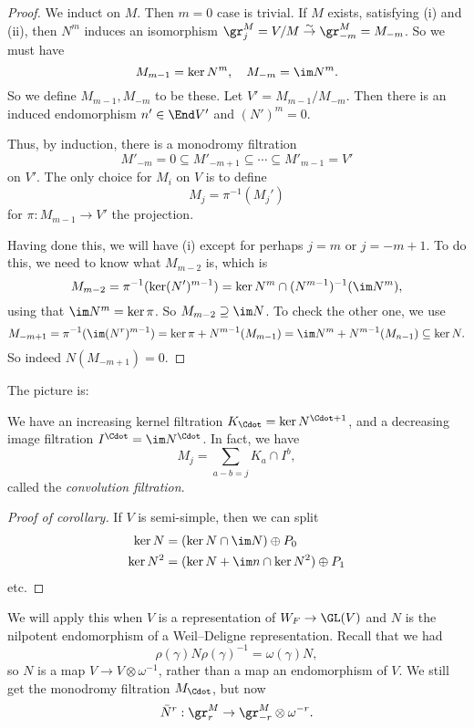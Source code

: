 \documentclass[a4paper]{article}
\begin{document}
\begin{proof}
  We induct on $M$. Then $m = 0$ case is trivial. If $M$ exists, satisfying (i) and (ii), then $N^m$ induces an isomorphism $\gr_j^M = V/M \overset{\sim}{\to} \gr_{-m}^M = M_{-m}$. So we must have
  \[
    M_{m - 1}  = \ker N^m,\quad M_{-m} = \im N^m.
  \]
  So we define $M_{m - 1}, M_{-m}$ to be these. Let $V' = M_{m - 1}/M_{-m}$. Then there is an induced endomorphism $n' \in \End V'$ and $(N')^m = 0$.

  Thus, by induction, there is a monodromy filtration
  \[
    M'_{-m} = 0 \subseteq M'_{-m + 1} \subseteq \cdots \subseteq M'_{m - 1} = V'
  \]
  on $V'$. The only choice for $M_i$ on $V$ is to define
  \[
    M_j = \pi^{-1}(M_j')
  \]
  for $\pi: M_{m - 1} \to V'$ the projection.

  Having done this, we will have (i) except for perhaps $j = m$ or $j = -m + 1$. To do this, we need to know what $M_{m - 2}$ is, which is
  \[
    M_{m - 2} = \pi^{-1}(\ker (N')^{m - 1}) = \ker N^m \cap (N^{m - 1})^{-1} (\im N^m),
  \]
  using that $\im N^m = \ker \pi$. So $M_{m - 2} \supseteq \im N$. To check the other one, we use
  \[
    M_{-m + 1} = \pi^{-1}(\im(N^r)^{m- 1}) = \ker \pi + N^{m - 1}(M_{m- 1}) = \im N^m + N^{m - 1}(M_{n - 1}) \subseteq \ker N.
  \]
  So indeed $N(M_{-m + 1}) = 0$. %
\end{proof}

The picture is:


We have an increasing kernel filtration $K_{\Cdot} = \ker N^{\Cdot + 1}$, and a decreasing image filtration $I^\Cdot = \im N^\Cdot$. In fact, we have
\[
  M_j = \sum_{a - b = j} K_a \cap I^b,
\]
called the \emph{convolution filtration}.
\begin{proof}[Proof of corollary]
  If $V$ is semi-simple, then we can split
  \begin{align*}
    \ker N &= (\ker N \cap \im N) \oplus P_0\\
    \ker N^2 &= (\ker N + \im n \cap \ker N^2) \oplus P_1
  \end{align*}
  etc. %
\end{proof}
We will apply this when $V$ is a representation of $W_F \to \GL(V)$ and $N$ is the nilpotent endomorphism of a Weil--Deligne representation. Recall that we had
\[
  \rho(\gamma) N \rho(\gamma)^{-1} = \omega(\gamma) N,
\]
so $N$ is a map $V \to V \otimes \omega^{-1}$, rather than a map an endomorphism of $V$. We still get the monodromy filtration $M_{\Cdot}$, but now
\[
  \bar{N}^r: \gr_r^M \to \gr_{-r}^M \otimes \omega^{-r}.
\]
\end{document}
